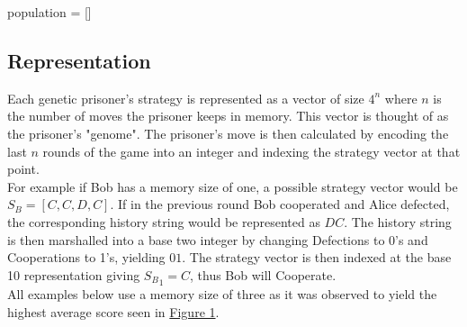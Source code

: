 \documentclass[12pt]{article}
\begin{document}
\begin{algorithm}[H]
 population = [] \;
\end{algorithm}

\subsection{Representation}
Each genetic prisoner's strategy is represented as a vector of size
$4^n$ where $n$ is the number of moves the prisoner keeps in memory.  This vector
is thought of as the prisoner's "genome".
The prisoner's move is then calculated by encoding the last $n$ rounds of the game
into an integer and indexing the strategy vector at that point. \\

For example if Bob has
a memory size of one, a possible strategy vector would be
$S_B = [C, C, D, C]$.  If in the previous round Bob cooperated and Alice defected,
the corresponding history string would be represented as $DC$.
The history string is then
marshalled into a base two integer by changing Defections to 0's and Cooperations
to 1's, yielding $01$.  The strategy vector is then indexed at the base
10 representation giving ${S_B}_1 = C$, thus Bob will Cooperate. \\

All examples below use a memory size of three as it was observed to yield the
highest average score seen in \hyperref[fig1]{Figure 1}.
\end{document}
